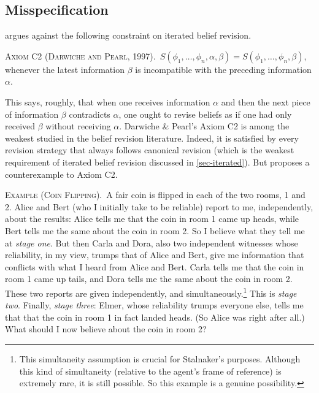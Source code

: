 \subsection{Misspecification}\label{sec-misspecification}


\citet{stalnaker2009iterated} argues against the following constraint on iterated belief revision. \op

	\xm \textsc{Axiom C2 (Darwiche and Pearl, 1997).}\, $S(\phi_1, \ldots, \phi_n, \alpha, \beta) = S(\phi_1, \ldots, \phi_n, \beta)$, whenever the latest information $\beta$ is incompatible with the preceding information $\alpha$.

\ed This says, roughly, that when one receives information $\alpha$ and then the next piece of information $\beta$ contradicts $\alpha$, one ought to revise beliefs as if one had only received $\beta$ without receiving $\alpha$. Darwiche \& Pearl's Axiom C2 is among the weakest studied in the belief revision literature. Indeed, it is satisfied by every revision strategy that always follows canonical revision (which is the weakest requirement of iterated belief revision discussed in \autoref{sec-iterated}). But \citet{stalnaker2009iterated} proposes a counterexample to Axiom C2. \op

	\xm \textsc{Example (Coin Flipping).}\, 
	A fair coin is flipped in each of the two rooms, 1 and 2. Alice and Bert (who I initially take to be reliable) report to me, independently, about the results: Alice tells me that the coin in room 1 came up heads, while Bert tells me the same about the coin in room 2. So I believe what they tell me at {\em stage one}. But then Carla and Dora, also two independent witnesses whose reliability, in my view, trumps that of Alice and Bert, give me information that conflicts with what I heard from Alice and Bert. Carla tells me that the coin in room 1 came up tails, and Dora tells me the same about the coin in room 2. These two reports are given independently, and simultaneously.\footnote
		{This simultaneity assumption is crucial for Stalnaker's purposes. Although this kind of simultaneity (relative to the agent's frame of reference) is extremely rare, it is still possible. So this example is a genuine possibility.}
	This is {\em stage two}. Finally, {\em stage three}: Elmer, whose reliability trumps everyone else, tells me that that the coin in room 1 in fact landed heads. (So Alice was right after all.) What should I now believe about the coin in room 2?

